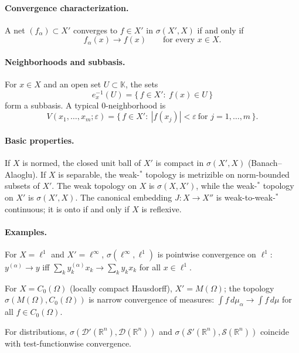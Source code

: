 \documentclass[12pt,a4paper]{article}
\theoremstyle{plain}
\theoremstyle{definition}
\theoremstyle{remark}
\theoremstyle{remark}
\begin{document}
\bigskip

\paragraph{Convergence characterization.}
A net $(f_\alpha)\subset X'$ converges to $f\in X'$ in $\sigma(X',X)$ if and only if
\[
f_\alpha(x)\longrightarrow f(x)\qquad\text{for every }x\in X.
\]

\smallskip

\paragraph{Neighborhoods and subbasis.}
For $x\in X$ and an open set $U\subset\mathbb K$, the sets
\[
e_x^{-1}(U)=\{\,f\in X':\ f(x)\in U\,\}
\]
form a subbasis. A typical $0$-neighborhood is
\[
V(x_1,\dots,x_m;\varepsilon)
=\bigl\{\,f\in X':\ |f(x_j)|<\varepsilon\ \text{for }j=1,\dots,m\,\bigr\}.
\]

\smallskip

\paragraph{Basic properties.}
If $X$ is normed, the closed unit ball of $X'$ is compact in $\sigma(X',X)$ (Banach--Alaoglu).
If $X$ is separable, the weak-$^\ast$ topology is metrizible on norm-bounded subsets of $X'$.
The weak topology on $X$ is $\sigma(X,X')$, while the weak-$^\ast$ topology on $X'$ is $\sigma(X',X)$.
The canonical embedding $J:X\to X''$ is weak-to-weak-$^\ast$ continuous; it is onto if and only if $X$ is reflexive.

\smallskip

\paragraph{Examples.}
For $X=\ell^1$ and $X'=\ell^\infty$, $\sigma(\ell^\infty,\ell^1)$ is pointwise convergence on $\ell^1$:
$y^{(\alpha)}\to y$ iff $\sum_k y^{(\alpha)}_k x_k\to\sum_k y_k x_k$ for all $x\in\ell^1$.

For $X=C_0(\Omega)$ (locally compact Hausdorff), $X'=M(\Omega)$; the topology $\sigma(M(\Omega),C_0(\Omega))$
is narrow convergence of measures: $\int f\,d\mu_\alpha\to\int f\,d\mu$ for all $f\in C_0(\Omega)$.

For distributions, $\sigma(\mathcal D'(\mathbb R^n),\mathcal D(\mathbb R^n))$ and
$\sigma(\mathcal S'(\mathbb R^n),\mathcal S(\mathbb R^n))$ coincide with test-functionwise convergence.
\end{document}
